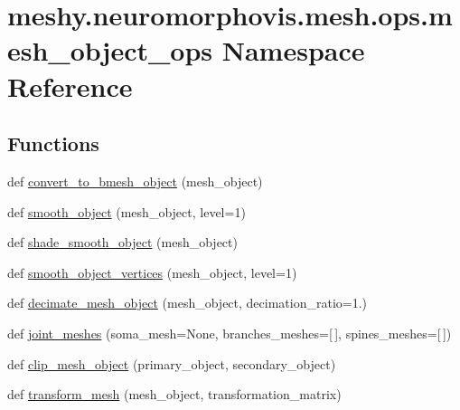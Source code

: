 \hypertarget{namespacemeshy_1_1neuromorphovis_1_1mesh_1_1ops_1_1mesh__object__ops}{}\section{meshy.\+neuromorphovis.\+mesh.\+ops.\+mesh\+\_\+object\+\_\+ops Namespace Reference}
\label{namespacemeshy_1_1neuromorphovis_1_1mesh_1_1ops_1_1mesh__object__ops}
\subsection*{Functions}
\begin{DoxyCompactItemize}
\item 
def \hyperlink{namespacemeshy_1_1neuromorphovis_1_1mesh_1_1ops_1_1mesh__object__ops_aa57bef98c6dc3b0302a38a98df2e8a6a}{convert\+\_\+to\+\_\+bmesh\+\_\+object} (mesh\+\_\+object)
\item 
def \hyperlink{namespacemeshy_1_1neuromorphovis_1_1mesh_1_1ops_1_1mesh__object__ops_ae5c9883e9e9b45ea1660cbd6203761fa}{smooth\+\_\+object} (mesh\+\_\+object, level=1)
\item 
def \hyperlink{namespacemeshy_1_1neuromorphovis_1_1mesh_1_1ops_1_1mesh__object__ops_adeca79d5efa663602ee8dc90330e1cef}{shade\+\_\+smooth\+\_\+object} (mesh\+\_\+object)
\item 
def \hyperlink{namespacemeshy_1_1neuromorphovis_1_1mesh_1_1ops_1_1mesh__object__ops_afc07ab7cfdcea2162f1bd6b3fb9c0dee}{smooth\+\_\+object\+\_\+vertices} (mesh\+\_\+object, level=1)
\item 
def \hyperlink{namespacemeshy_1_1neuromorphovis_1_1mesh_1_1ops_1_1mesh__object__ops_ac6ba8e835a4c65a473a6dc38ef113733}{decimate\+\_\+mesh\+\_\+object} (mesh\+\_\+object, decimation\+\_\+ratio=1.)
\item 
def \hyperlink{namespacemeshy_1_1neuromorphovis_1_1mesh_1_1ops_1_1mesh__object__ops_a0827e6fc10b80a1829ef46aaf70e7d53}{joint\+\_\+meshes} (soma\+\_\+mesh=None, branches\+\_\+meshes=\mbox{[}$\,$\mbox{]}, spines\+\_\+meshes=\mbox{[}$\,$\mbox{]})
\item 
def \hyperlink{namespacemeshy_1_1neuromorphovis_1_1mesh_1_1ops_1_1mesh__object__ops_a96eae9dc0aecc0e21f0974e302ede891}{clip\+\_\+mesh\+\_\+object} (primary\+\_\+object, secondary\+\_\+object)
\item 
def \hyperlink{namespacemeshy_1_1neuromorphovis_1_1mesh_1_1ops_1_1mesh__object__ops_a46f25189b948c4c5e063c2f585261fea}{transform\+\_\+mesh} (mesh\+\_\+object, transformation\+\_\+matrix)

\end{DoxyCompactItemize}
